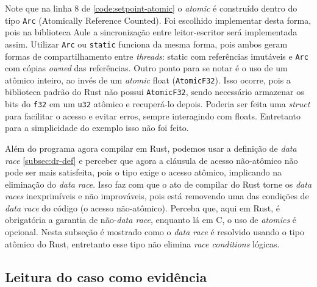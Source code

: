 
Note que na linha 8 de \ref{code:setpoint-atomic} o \textit{atomic} é construído dentro do tipo \texttt{Arc} (Atomically Reference Counted). Foi escolhido implementar desta forma, pois na biblioteca Aule a sincronização entre leitor-escritor será implementada assim. Utilizar \texttt{Arc} ou \texttt{static} funciona da mesma forma, pois ambos geram formas de compartilhamento entre \textit{threads}: static com referências imutáveis e \texttt{Arc} com cópias \textit{owned} das referências. Outro ponto para se notar é o uso de um atômico inteiro, ao invés de um \textit{atomic} float (\texttt{AtomicF32}). Isso ocorre, pois a biblioteca padrão do Rust não possui \texttt{AtomicF32}, sendo necessário armazenar os bits do \texttt{f32} em um \texttt{u32} atômico e recuperá-lo depois. Poderia ser feita uma \textit{struct} para facilitar o acesso e evitar erros, sempre interagindo com floats. Entretanto para a simplicidade do exemplo isso não foi feito.

Além do programa agora compilar em Rust, podemos usar a definição de \textit{data race} \ref{subsec:dr-def} e perceber que agora a cláusula de acesso não-atômico não pode ser mais satisfeita, pois o tipo exige o acesso atômico, implicando na eliminação do \textit{data race}. Isso faz com que o ato de compilar do Rust torne os \textit{data races} inexprimíveis e não improváveis, pois está removendo uma das condições de \textit{data race} do código (o acesso não-atômico). Perceba que, aqui em Rust, é obrigatória a garantia de não-\textit{data race}, enquanto lá em C, o uso de \textit{atomics} é opcional. Nesta subseção é mostrado como o \textit{data race} é resolvido usando o tipo atômico do Rust, entretanto esse tipo não elimina \textit{race conditions} lógicas.

\subsection{Leitura do caso como evidência}
\label{subsec:setpoint-evidence}

